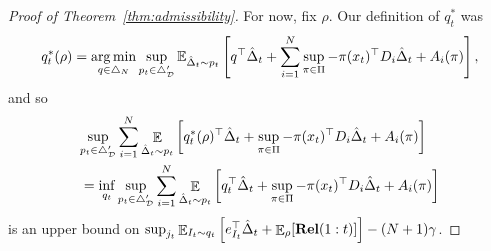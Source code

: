 \documentclass[11pt]{article}
\newcommand{\rel}{\mathbf{Rel}}
\begin{document}
\begin{proof}[Proof of Theorem~\ref{thm:admissibility}]
For now, fix $\rho$. Our definition of $q_t^*$ was 
\[
  q_t^*(\rho)
  =
  \operatorname*{arg\,min}_{q \in \triangle_{N}}
  \sup_{p_t \in \triangle_{\mathcal D}'}
  \mathbb E_{\hat\Delta_t\sim p_t}\left[
  q^\top \hat \Delta_t
    +
    \sum_{i=1}^N \sup_{\pi\in\Pi} -\pi(x_t)^\top D_i\hat\Delta_t + A_i(\pi)\right],
  \]
  and so
  \begin{align*}
    &\lefteqn{\sup_{p_t\in\triangle_{\mathcal D}'}\sum_{i=1}^N \mathop{\ex}_{\hat\Delta_t\sim p_t}\left[ q_t^*(\rho)^\top \hat \Delta_t
    +
  \sup_{\pi\in\Pi} -\pi(x_t)^\top D_i\hat\Delta_t + A_i(\pi)\right]}\\
    &=
      \inf_{q_t}
      \sup_{p_t\in\triangle_{\mathcal D}'}\sum_{i=1}^N \mathop{\ex}_{\hat\Delta_t\sim p_t}\left[ q_t^\top \hat \Delta_t
    +
  \sup_{\pi\in\Pi} -\pi(x_t)^\top D_i\hat\Delta_t + A_i(\pi)\right]
\end{align*}
is an upper bound on $  \sup_{j_t} \mathop{\ex}_{I_t\sim q_t}\left[ e_{I_t}^\top \hat \Delta_t
  + \mathop{\ex}_{\rho}[\rel(1:t)]\right] -(N+1)\gamma$.


\end{proof}
\end{document}
